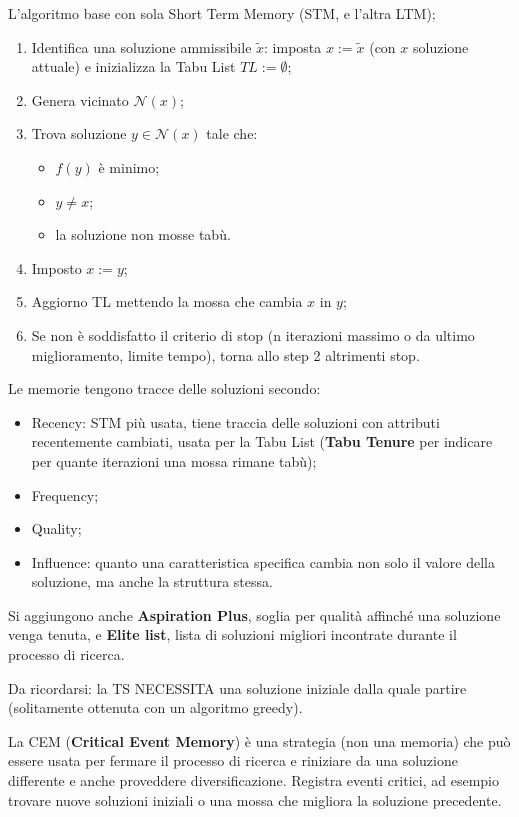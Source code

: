 L'algoritmo base con sola Short Term Memory (STM, e l'altra LTM);
\begin{enumerate}
	\item Identifica una soluzione ammissibile $\tilde{x}$: imposta $x:=\tilde{x}$ (con $x$ soluzione attuale) e inizializza la Tabu List $TL:=\emptyset$;
	\item Genera vicinato $\mathcal{N}(x)$;
	\item Trova soluzione $y\in \mathcal{N}(x)$ tale che:
	\begin{itemize}
		\item $f(y)$ è minimo;
		\item $y\neq x$;
		\item la soluzione non mosse tabù.
	\end{itemize}
	\item Imposto $x:=y$;
	\item Aggiorno TL mettendo la mossa che cambia $x$ in $y$;
	\item Se non è soddisfatto il criterio di stop (n iterazioni massimo o da ultimo miglioramento, limite tempo), torna allo step 2 altrimenti stop.
\end{enumerate}
Le memorie tengono tracce delle soluzioni secondo:
\begin{itemize}
	\item Recency: STM più usata, tiene traccia delle soluzioni con attributi recentemente cambiati, usata per la Tabu List (\textbf{Tabu Tenure} per indicare per quante iterazioni una mossa rimane tabù);
	\item Frequency;
	\item Quality;
	\item Influence: quanto una caratteristica specifica cambia non solo il valore della soluzione, ma anche la struttura stessa.
\end{itemize}
Si aggiungono anche \textbf{Aspiration Plus}, soglia per qualità affinché una soluzione venga tenuta, e \textbf{Elite list}, lista di soluzioni migliori incontrate durante il processo di ricerca.

Da ricordarsi: la TS NECESSITA una soluzione iniziale dalla quale partire (solitamente ottenuta con un algoritmo greedy).

La CEM (\textbf{Critical Event Memory}) è una strategia (non una memoria) che può essere usata per fermare il processo di ricerca e riniziare da una soluzione differente e anche proveddere diversificazione. Registra eventi critici, ad esempio trovare nuove soluzioni iniziali o una mossa che migliora la soluzione precedente.

